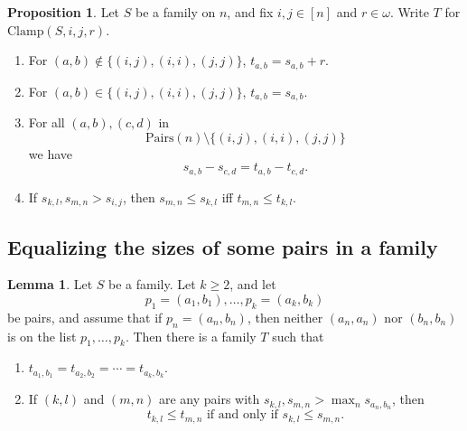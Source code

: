 \documentclass[12pt]{article}
\theoremstyle{definition}
\newtheorem{lemma}[theorem]{Lemma}
\newtheorem{proposition}{Proposition}
\newcommand{\set}[1]{\{ #1 \}}
\newcommand{\rem}[1]{\relax}
\newcommand{\OffDiag}{\mbox{Off-diag}}
\newcommand{\Pairs}{\mbox{Pairs}}
\newcommand{\Bad}{\mbox{Bad}}
\newcommand{\Clamp}{\mbox{Clamp}}
\begin{document}
\begin{proposition}
Let $S$ be a family on $n$, and fix $i,j\in[n]$
and $r\in\omega$.
Write $T$ for $\Clamp(S,i,j,r)$.
\begin{enumerate}
    \item For $(a,b)\notin \set{(i,j),(i,i),(j,j)}$, $t_{a,b} = s_{a,b} + r$.
    \item For $(a,b)\in \set{(i,j),(i,i),(j,j)}$, $t_{a,b} = s_{a,b}$.
    \item For all $(a,b), (c,d)$
    in \[\Pairs(n)\setminus
    \set{(i,j),(i,i),(j,j)} \]
we have 
\[ s_{a,b} - s_{c,d} = t_{a,b} - t_{c,d}.\]
\rem{\item $\Bad(T)\setminus\Bad(S)$ is a subset of
\[\set{((a,b),(c,d))\in \Pairs(n)^2 : \mbox{either $(a,b)$ or $(c,d)$ belongs to $ \set{(i,j),(i,i),(j,j)}$}}.\]
\item  \marginpar{This point is slightly off, in 
addition to being awkward.}
$(\Bad(T)\cap \OffDiag(n)^2)\setminus
(\Bad(S)\cap \OffDiag(n)^2)$ is exactly
\[ 
\begin{array}{lcl}
& \set{(i,j),(c,d))\in\OffDiag(n)^2 :0\leq |S_i\cup S_j| - |S_c \cup S_d| \leq p} \\
\cup & \set{(c,d),(i,j))\in\OffDiag(n)^2  :0\leq |S_i\cup S_j| - |S_c \cup S_d| \leq p} \\
\end{array}
\]
    \item If $i = j$ and $f(S) = 0$, then $f(T) = 0$.
}
\item If $s_{k,l}, s_{m,n} > s_{i,j}$,
then $s_{m,n}\leq s_{k,l}$ iff
 $t_{m,n}\leq t_{k,l}$.

\end{enumerate}
\label{proposition-clamp}
\end{proposition}

\subsection{Equalizing the sizes of some pairs in a family}

\begin{lemma}
Let $S$ be a family.  Let $k\geq 2$, and let 
\[p_1 = (a_1,b_1), \ldots, p_k =(a_k,b_k)\]
be pairs,
and assume that if $p_n = (a_n, b_n)$, 
then neither $(a_n,a_n)$ nor  $(b_n,b_n)$ is  on the list 
$p_1, \ldots, p_k$.
Then there is a family $T$ such that 
\begin{enumerate}
    \item $t_{a_1, b_1} = t_{a_2, b_2} = \cdots = t_{a_k, b_k}$.
    \item If $(k,l)$ and $(m,n)$ are any pairs with $s_{k,l}, s_{m,n} >
    \max_n s_{a_n,b_n}$,
    then 
    \[ \mbox{$t_{k,l} \leq t_{m,n} $ if and only if $s_{k,l} \leq s_{m,n} $}.\]
\label{equalize2}
\end{enumerate}
\label{lemma-equalize}
\end{lemma}
\end{document}
